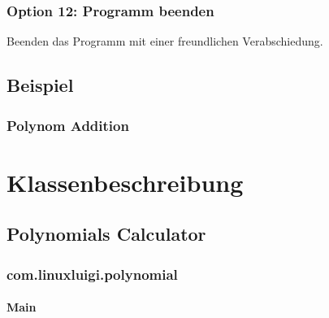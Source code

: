 \documentclass[letterpaper,10pt,ngerman]{sphinxmanual}
\begin{document}


\subsection{Option 12: Programm beenden}
\label{menu:option-12-programm-beenden}
Beenden das Programm mit einer freundlichen Verabschiedung.



\section{Beispiel}
\label{example::doc}\label{example:beispiel}

\subsection{Polynom Addition}
\label{example:polynom-addition}

\chapter{Klassenbeschreibung}
\label{index:klassenbeschreibung}\label{index:index-0}

\section{Polynomials Calculator}
\label{packages:polynomials-calculator}\label{packages::doc}

\subsection{com.linuxluigi.polynomial}
\label{com/linuxluigi/polynomial/package-index::doc}\label{com/linuxluigi/polynomial/package-index:com-linuxluigi-polynomial}\label{com/linuxluigi/polynomial/package-index:package-com.linuxluigi.polynomial}

\subsubsection{Main}
\label{com/linuxluigi/polynomial/Main:main}\label{com/linuxluigi/polynomial/Main::doc}
\end{document}
